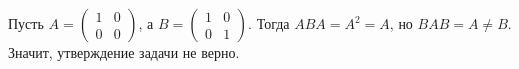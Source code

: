 \documentclass{article}
\begin{document}
Пусть $A = \begin{pmatrix}1&0\\0&0\end{pmatrix}$, а $B = \begin{pmatrix}1&0\\0&1\end{pmatrix}$. Тогда $ABA = A^2 = A$, 
но $BAB = A \neq B$. Значит, утверждение задачи не верно.
\end{document}
